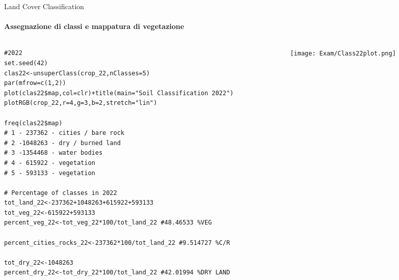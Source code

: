 \documentclass{beamer}  %
\begin{document}
\begin{frame}[fragile]{Land Cover Classification}
    \framesubtitle{Assegnazione di classi e mappatura di vegetazione}
    \begin{columns}
        \begin{column}{0.45\textwidth}
            \begin{lstlisting}[style=mystyle]
#2022
set.seed(42) 
clas22<-unsuperClass(crop_22,nClasses=5)
par(mfrow=c(1,2))
plot(clas22$map,col=clr)+title(main="Soil Classification 2022")
plotRGB(crop_22,r=4,g=3,b=2,stretch="lin")

freq(clas22$map)
# 1 - 237362 - cities / bare rock  
# 2 -1048263 - dry / burned land
# 3 -1354468 - water bodies
# 4 - 615922 - vegetation
# 5 - 593133 - vegetation

# Percentage of classes in 2022
tot_land_22<-237362+1048263+615922+593133
tot_veg_22<-615922+593133
percent_veg_22<-tot_veg_22*100/tot_land_22 #48.46533 %VEG

percent_cities_rocks_22<-237362*100/tot_land_22 #9.514727 %C/R

tot_dry_22<-1048263 
percent_dry_22<-tot_dry_22*100/tot_land_22 #42.01994 %DRY LAND
            \end{lstlisting}
        \end{column}
        \begin{column}{0.47\textwidth}
            \texttt{[image: Exam/Class22plot.png]}
        \end{column}
    \end{columns}
\end{frame}
\end{document}
